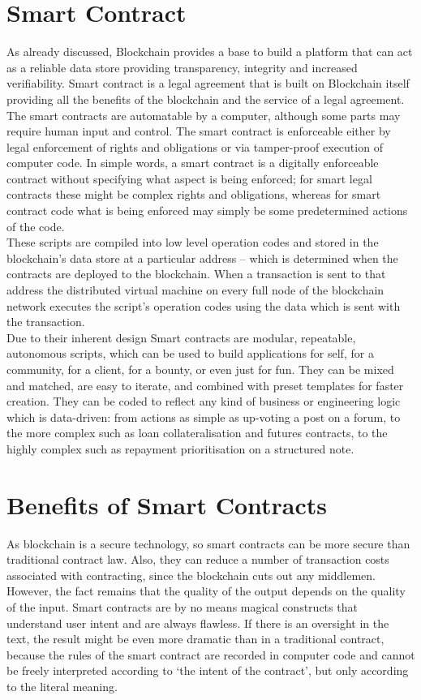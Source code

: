 \section{Smart Contract}
As already discussed, Blockchain provides a base to build a platform that can act as a reliable data store providing transparency, integrity and increased verifiability. Smart contract is a legal agreement that is built on Blockchain itself providing all the benefits of the blockchain and the service of a legal agreement. The smart contracts are automatable by a computer, although some parts may require human input and control. The smart contract is enforceable either by legal enforcement of rights and obligations or via tamper-proof execution of computer code.\cite{Clack2016SmartDirections}
In simple words, a smart contract is a digitally enforceable contract without specifying what aspect is being enforced; for smart legal contracts these might be complex rights and obligations, whereas for smart contract code what is being enforced may simply be some predetermined actions of the code.
\\These scripts are compiled into low level operation codes and stored in the blockchain’s data store at a particular address – which is determined when the contracts are deployed to the blockchain. When a transaction is sent to that address the distributed virtual machine on every full node of the blockchain network executes the script’s operation codes using the data which is sent with the transaction. \cite{MonaxContracts}
\\Due to their inherent design Smart contracts are modular, repeatable, autonomous scripts, which can be used to build applications for self, for a community, for a client, for a bounty, or even just for fun. They can be mixed and matched, are easy to iterate, and combined with preset templates for faster creation.
They can be coded to reflect any kind of business or engineering logic which is data-driven: from actions as simple as up-voting a post on a forum, to the more complex such as loan collateralisation and futures contracts, to the highly complex such as repayment prioritisation on a structured note.

\section{Benefits of Smart Contracts}
As blockchain is a secure technology, so smart contracts can be more secure than traditional contract law. Also, they can reduce a number of transaction costs associated with contracting, since the blockchain cuts out any middlemen. However, the fact remains that the quality of the output depends on the quality of the input. Smart contracts are by no means magical constructs that understand user intent and are always flawless. If there is an oversight in the text, the result might be even more dramatic than in a traditional contract, because the rules of the smart contract are recorded in computer code and cannot be freely interpreted according to ‘the intent of the contract’, but only according to the literal meaning.

